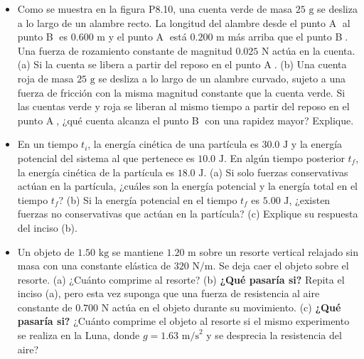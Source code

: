\documentclass[11pt,a4paper]{article}
\begin{document}
\begin{itemize}
    \item[\textbf{10.}] Como se muestra en la figura P8.10, una cuenta verde de masa $25 \text{ g}$ se desliza a lo largo de un alambre recto. La longitud del alambre desde el punto \textcircled{A} al punto \textcircled{B} es $0.600 \text{ m}$ y el punto \textcircled{A} está $0.200 \text{ m}$ más arriba que el punto \textcircled{B}. Una fuerza de rozamiento constante de magnitud $0.025 \text{ N}$ actúa en la cuenta. (a) Si la cuenta se libera a partir del reposo en el punto \textcircled{A}. (b) Una cuenta roja de masa $25 \text{ g}$ se desliza a lo largo de un alambre curvado, sujeto a una fuerza de fricción con la misma magnitud constante que la cuenta verde. Si las cuentas verde y roja se liberan al mismo tiempo a partir del reposo en el punto \textcircled{A}, ¿qué cuenta alcanza el punto \textcircled{B} con una rapidez mayor? Explique.
    \vspace*{6cm}

    \item[\textbf{11.}] En un tiempo $t_i$, la energía cinética de una partícula es $30.0 \text{ J}$ y la energía potencial del sistema al que pertenece es $10.0 \text{ J}$. En algún tiempo posterior $t_f$, la energía cinética de la partícula es $18.0 \text{ J}$. (a) Si solo fuerzas conservativas actúan en la partícula, ¿cuáles son la energía potencial y la energía total en el tiempo $t_f$? (b) Si la energía potencial en el tiempo $t_f$ es $5.00 \text{ J}$, ¿existen fuerzas no conservativas que actúan en la partícula? (c) Explique su respuesta del inciso (b).
    \vspace*{6cm}

    \item[\textbf{12.}] Un objeto de $1.50 \text{ kg}$ se mantiene $1.20 \text{ m}$ sobre un resorte vertical relajado sin masa con una constante elástica de $320 \text{ N/m}$. Se deja caer el objeto sobre el resorte. (a) ¿Cuánto comprime al resorte? (b) \textbf{¿Qué pasaría si?} Repita el inciso (a), pero esta vez suponga que una fuerza de resistencia al aire constante de $0.700 \text{ N}$ actúa en el objeto durante su movimiento. (c) \textbf{¿Qué pasaría si?} ¿Cuánto comprime el objeto al resorte si el mismo experimento se realiza en la Luna, donde $g = 1.63 \text{ m/s}^2$ y se desprecia la resistencia del aire?
    \vspace*{7cm}
\end{itemize}

\newpage
\end{document}
